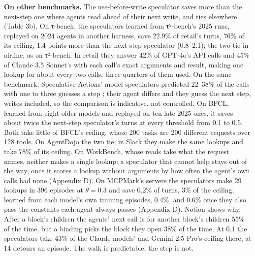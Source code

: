 \documentclass[10pt,twocolumn,letterpaper]{article}
\newcommand{\runin}[1]{{\sffamily\bfseries\color{accent}#1}}
\begin{document}
\runin{On other benchmarks.} The use-before-write speculator saves more than the next-step one where agents read ahead of their next write, and ties elsewhere (Table 3b). On τ-bench, the speculators learned from τ²-bench's 2025 runs, replayed on 2024 agents in another harness, save 22.9\% of retail's turns, 76\% of its ceiling, 1.4 points more than the next-step speculator (0.8--2.1); the two tie in airline, as on τ²-bench. In retail they answer 42\% of GPT-4o's API calls and 45\% of Claude 3.5 Sonnet's with each call's exact arguments and result, making one lookup for about every two calls, three quarters of them used. On the same benchmark, Speculative Actions' model speculators predicted 22--38\% of the calls with one to three guesses a step \citep{ye2026speculativeactions}; their agent differs and they guess the next step, writes included, so the comparison is indicative, not controlled. On BFCL, learned from eight older models and replayed on ten late-2025 ones, it saves about twice the next-step speculator's turns at every threshold from 0.1 to 0.5. Both take little of BFCL's ceiling, whose 200 tasks are 200 different requests over 128 tools. On AgentDojo the two tie; in Slack they make the same lookups and take 78\% of its ceiling. On WorkBench, whose reads take what the request names, neither makes a single lookup: a speculator that cannot help stays out of the way, once it scores a lookup without arguments by how often the agent's own calls had none (Appendix D). On MCPMark's servers the speculators make 29 lookups in 396 episodes at \(\theta = 0.3\) and save 0.2\% of turns, 3\% of the ceiling; learned from each model's own training episodes, 0.4\%, and 0.6\% once they also pass the constants each agent always passes (Appendix D). Notion shows why. After a block's children the agents' next call is for another block's children 55\% of the time, but a binding picks the block they open 38\% of the time. At 0.1 the speculators take 43\% of the Claude models' and Gemini 2.5 Pro's ceiling there, at 14 detours an episode. The walk is predictable; the step is not.
\end{document}
